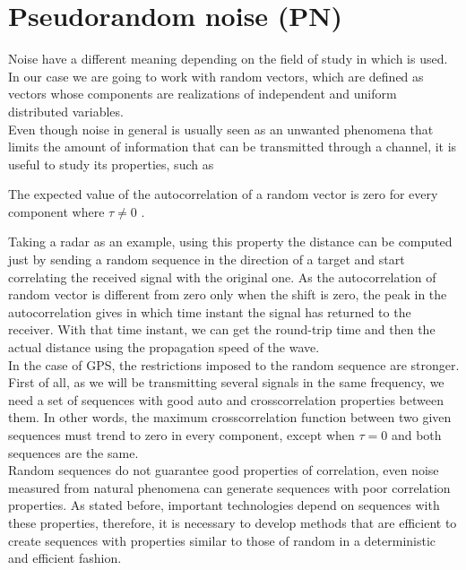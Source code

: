 \section{Pseudorandom noise (PN)}

Noise have a different meaning depending on the field of study in which is
used. In our case we are going to work with random vectors,
which are defined as vectors whose components are realizations of independent
and uniform distributed variables\cite{white_noise}.\\

Even though noise in general is usually seen as an unwanted phenomena that
limits the amount of information that can be transmitted through a
channel\cite{shannon_noise}, it is useful to study its properties, such as


\begin{property}
 The expected value of the autocorrelation of a random vector is zero for
 every component
  where $\tau \neq 0$ \cite{everett}.
\end{property}

Taking a radar as an example, using this property the distance can be computed
just by sending a random sequence in the direction of a target and start
correlating the received signal with the original one. As the autocorrelation
of random vector is different from zero only when the shift is zero, the peak
in the autocorrelation gives in which time instant the signal has returned to
the receiver. With that time instant, we can get the round-trip time and then
the actual distance using the propagation speed of the wave.\\

In the case of GPS, the restrictions imposed to the random sequence are
stronger. First of all, as we will be transmitting several signals in the same
frequency, we need a set of sequences with good auto and crosscorrelation
properties between them. In other words, the maximum crosscorrelation function
between two given sequences must trend to zero in every component, except when
$\tau = 0$ and both sequences are the same.\\

Random sequences do not guarantee good properties of correlation, even noise
measured from natural phenomena can generate sequences with poor correlation
properties. As stated before, important technologies depend on sequences with
these properties, therefore, it is necessary to develop methods that are
efficient to create sequences with properties similar to those of random in a
deterministic and efficient fashion.\\

